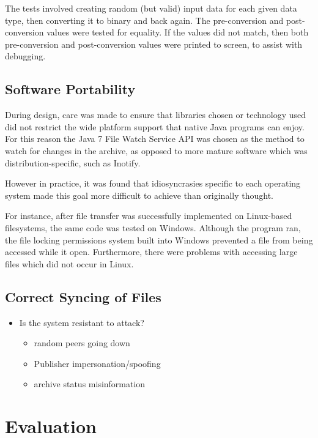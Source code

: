 \documentclass[12pt,a4paper,]{adreport}
\begin{document}
The tests involved creating random (but valid) input data for each given
data type, then converting it to binary and back again. The
pre-conversion and post-conversion values were tested for equality. If
the values did not match, then both pre-conversion and post-conversion
values were printed to screen, to assist with debugging.

\section{Software Portability}\label{software-portability}

During design, care was made to ensure that libraries chosen or technology used did not restrict the wide platform support that native Java programs can enjoy. For this reason the Java 7 File Watch Service API was chosen as the method to watch for changes in the archive, as opposed to more mature software which was distribution-specific, such as Inotify.

However in practice, it was found that idiosyncrasies specific to each operating system made this goal more difficult to achieve than originally thought.

For instance, after file transfer was successfully implemented on Linux-based filesystems, the same code was tested on Windows. Although the program ran, the file locking permissions system built into Windows prevented a file from being accessed while it open. Furthermore, there were problems with accessing large files which did not occur in Linux.

\section{Correct Syncing of Files}\label{correct-syncing-of-files}

\begin{itemize}
\itemsep1pt\parskip0pt
\item
  Is the system resistant to attack?

  \begin{itemize}
  \itemsep1pt\parskip0pt
  \item
    random peers going down
  \item
    Publisher impersonation/spoofing
  \item
    archive status misinformation
  \end{itemize}
\end{itemize}

\chapter{Evaluation}\label{evaluation}
\end{document}
